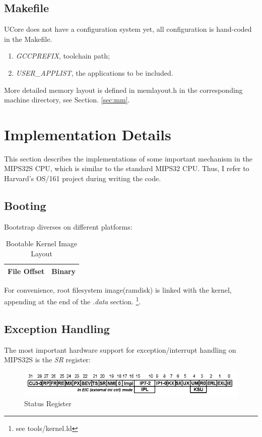 \documentclass[a4paper]{article}
\begin{document}
\subsection{Makefile}
UCore does not have a configuration system yet, all configuration
is hand-coded in the Makefile.
\begin{enumerate}
\item \emph{GCCPREFIX}, toolchain path;
\item \emph{USER\_APPLIST}, the applications to be included.
\end{enumerate}

More detailed memory layout is defined in memlayout.h in the corresponding
machine directory, see Section. \ref{sec:mm}.

\section{Implementation Details}
This section describes the implementations of some important mechanism 
in the MIPS32S CPU, which is similar to the standard MIPS32 CPU.
Thus, I refer to Harvard's OS/161\cite{OS161} project during writing the code.

\subsection{Booting}
Bootstrap diverses on different platforms: 
\begin{table}[h]
  \centering
  \begin{tabular}{|r|r|}
    \hline
    File Offset & Binary \\
    \hline
    \hline
  \end{tabular}
  \caption{Bootable Kernel Image Layout}
  \label{tab:layout}
\end{table}

For convenience, root filesystem image(ramdisk) is linked
with the kernel, appending at the end of the \emph{.data} section.
\footnote{see tools/kernel.ld}.

\subsection{Exception Handling}
The most important hardware support for exception/interrupt handling on MIPS32S is the \emph{SR}
register:

\begin{figure}[h]
\centering
\includegraphics[width=0.8\linewidth]{reg-sr.png}
\caption{Status Register\cite{Sweetman:2006:SMR:1210986}}
\label{fig:reg-sr}
\end{figure}
\end{document}
